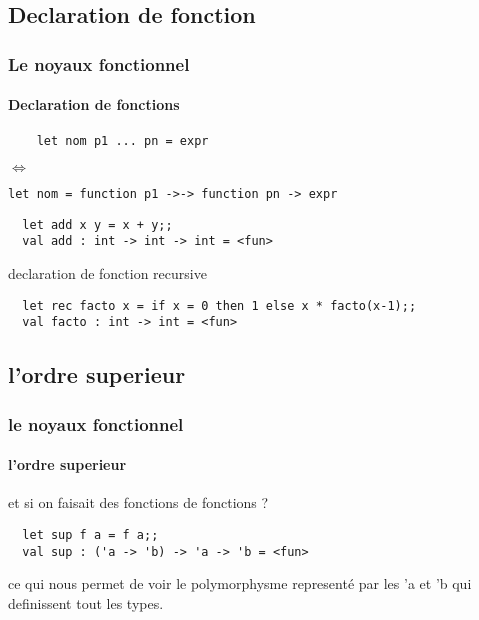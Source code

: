 \subsection{Declaration de fonction}
\begin{frame}[fragile]
  \frametitle{Le noyaux fonctionnel}
  \framesubtitle{Declaration de fonctions}
    \begin{lstlisting}
	let nom p1 ... pn = expr
    \end{lstlisting}
	\begin{center}
	  \begin{rotate}{90}
     $\Leftrightarrow$
   \end{rotate}
\end{center}
\begin{lstlisting}
let nom = function p1 ->-> function pn -> expr
  \end{lstlisting}
  \vspace{1cm}
  \begin{lstlisting}
  let add x y = x + y;;
  val add : int -> int -> int = <fun>
  \end{lstlisting}
  declaration de fonction recursive 
  \begin{lstlisting}
  let rec facto x = if x = 0 then 1 else x * facto(x-1);;
  val facto : int -> int = <fun>
  \end{lstlisting}
\end{frame}
\subsection{l'ordre superieur}
\begin{frame}[fragile]
  \frametitle{le noyaux fonctionnel}
  \framesubtitle{l'ordre superieur}
  et si on faisait des fonctions de fonctions ? 
 \begin{lstlisting}
  let sup f a = f a;;
  val sup : ('a -> 'b) -> 'a -> 'b = <fun>
 \end{lstlisting}
 ce qui nous permet de voir le polymorphysme representé par les 'a et 'b qui definissent tout les types.
\end{frame}

